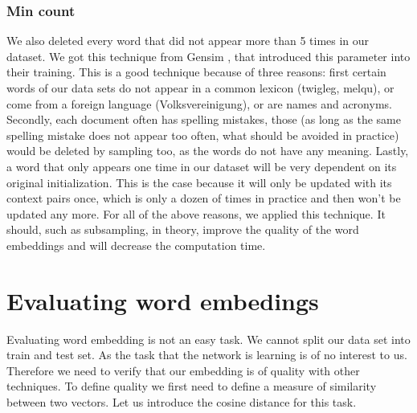 \subsubsection{Min count}
We also deleted every word that did not appear more than 5 times in our dataset. We got this technique from Gensim \cite{gensim}, that introduced this parameter into their training. This is a good technique because of three reasons: first certain words of our data sets do not appear in a common lexicon (twigleg, melqu), or come from a foreign language (Volksvereinigung), or are names and acronyms. Secondly, each document often has spelling mistakes, those (as long as the same spelling mistake does not appear too often, what should be avoided in practice) would be deleted by sampling too, as the words do not have any meaning. Lastly, a word that only appears one time in our dataset will be very dependent on its original initialization. This is the case because it will only be updated with its context pairs once, which is only a dozen of times in practice and then won't be updated any more. For all of the above reasons, we applied this technique. It should, such as subsampling, in theory, improve the quality of the word embeddings and will decrease the computation time. 

\section{Evaluating word embedings}
Evaluating word embedding is not an easy task. We cannot split our data set into train and test set. As the task that the network is learning is of no interest to us. Therefore we need to verify that our embedding is of quality with other techniques. To define quality we first need to define a measure of similarity between two vectors. Let us introduce the cosine distance for this task. 
